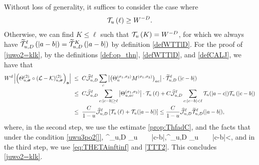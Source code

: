 Without loss of generality, it suffices to consider the case where 
\begin{align}\label{uwu3po2[]}
     {\mathcal T}_{u}\left({\ell}\right)\ge  W^{-D}. 
\end{align} 
Otherwise, we can find $K\le \ell$ such that ${\mathcal T}_{u}\left({K}\right) = W^{-D}$, for which we always have \(\widetilde{{\mathcal T}}^{\ell}_{u,D}\left({|a-b|}\right)=\widetilde{{\mathcal T}}^{K}_{u,D}\left({|a-b|}\right)\) by definition \eqref{defWTTlD}. 
For the proof of \eqref{juwo2=klk}, by the definitions \eqref{def:op_thn}, \eqref{defWTTlD}, and \eqref{defCALJ}, we have that 
\begin{align} \label{uu2j2ois} W^d\left|{\left({\varTheta^{(2)}_{u,{\boldsymbol{\sigma}}}\circ({\mathcal L}-{\mathcal K})^{(2)}_{u,{\boldsymbol{\sigma}}}}\right)_{{{\mathbf{a}}}}}\right|&\; \le \;C \widehat{\mathcal J}^{\ell}_{u,D}\sum_c \big|\big(\Theta_{u}^{(\sigma_1,\sigma_2)}M^{(\sigma_1,\sigma_2)}\big)_{ac}\big|\cdot \widetilde{{\mathcal T}}^{\ell}_{u,D}\left({|c-b|}\right) \nonumber \\
&\; \le \;  C \widehat{\mathcal J}^{\ell}_{u,D}\sum_{c:|c-b|\ge \ell} \big|\Theta_{u,ac}^{(\sigma_1,\sigma_2)}\big|\cdot {\mathcal T}_{u}\left({\ell}\right) + C \widehat{\mathcal J}^{\ell}_{u,D}\sum_{c:|c-b|< \ell} \mathcal T_{u}(|a-c|){\mathcal T}_{u}\left({|c-b|}\right) \nonumber\\
&\; \le \;  \frac{C}{1-u} \widehat{\mathcal J}^{\ell}_{u,D}\left[{{\mathcal T}_{u}\left({\ell}\right) +\mathcal T_{u}(|a-b|)}\right] \le \frac{C}{1-u} \widehat{\mathcal J}^{\ell}_{u,D}\widetilde{\mathcal T}_{u,D}^{\ell}(|a-b|),
   \end{align} 
where, in the second step, we use the estimate \eqref{prop:ThfadC}, and the facts that under the condition \eqref{uwu3po2[]}, \be\label{eq;facts}^{\ell}_{u,D} _{u}\p{\ell}\ \ \ \ |c-b|\ge \ell,\quad {}^{\ell}_{u,D} _{u}\ \ \ \ |c-b|<\ell,
\ee
and in the third step, we use \eqref{eq:THETAinftinf} and \eqref{TTT2}. This concludes \eqref{juwo2=klk}.


